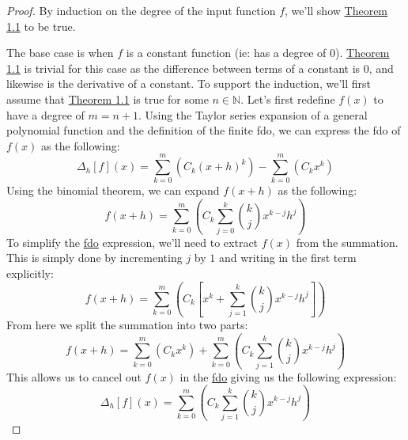 \begin{proof}
  By induction on the degree of the input function $f$, we'll show \hyperref[thm:equality-thm]{Theorem 1.1} to be true.\par\bigskip The base case is when $f$ is a constant function (ie: has a degree of $0$). \hyperref[thm:equality-thm]{Theorem 1.1} is trivial for this case as the difference between terms of a constant is $0$, and likewise is the derivative of a constant. To support the induction, we'll first assume that \hyperref[thm:equality-thm]{Theorem 1.1} is true for some $n\in\mathbb{N}$. Let's first redefine $f\left(x\right)$ to have a degree of $m=n+1$. Using the Taylor series expansion of a general polynomial function and the definition of the finite \ac{fdo}, we can express the \ac{fdo} of $f\left(x\right)$ as the following:
  \begin{equation}
    \label{eq:fdo-simplification}
    \Delta_{h}\left[f\right]\left(x\right)=\sum_{k=0}^{m}\left(C_k\left(x+h\right)^k\right)-\sum_{k=0}^{m}\left(C_kx^k\right)
  \end{equation}
  Using the binomial theorem, we can expand $f(x+h)$ as the following:
  \begin{equation}
    \label{eq:fdo-simplification-2}
    f\left(x+h\right)=\sum_{k=0}^{m}\left(C_k\sum_{j=0}^{k}{k\choose{j}}x^{k-j}h^j\right)
  \end{equation}
  To simplify the \hyperref[eq:fdo-simplification]{\ac{fdo}} expression, we'll need to extract $f\left(x\right)$ from the summation. This is simply done by incrementing $j$ by $1$ and writing in the first term explicitly:
  \begin{equation}
    \label{eq:fdo-simplification-3}
    f\left(x+h\right)=\sum_{k=0}^{m}\left(C_k\left[x^k+\sum_{j=1}^{k}{k\choose{j}}x^{k-j}h^j\right]\right)
  \end{equation}
  From here we split the summation into two parts:
  \begin{equation}
    \label{eq:fdo-simplification-4}
    f\left(x+h\right)=\sum_{k=0}^{m}\left(C_kx^k\right)+\sum_{k=0}^{m}\left(C_k\sum_{j=1}^{k}{k\choose{j}}x^{k-j}h^j\right)
  \end{equation}
  This allows us to cancel out $f\left(x\right)$ in the \hyperref[eq:fdo-simplification]{\ac{fdo}} giving us the following expression:
  \begin{equation}
    \label{eq:fdo-simplification-5}
    \Delta_{h}\left[f\right]\left(x\right)=\sum_{k=0}^{m}\left(C_k\sum_{j=1}^{k}{k\choose{j}}x^{k-j}h^j\right)
  \end{equation}

\end{proof}
